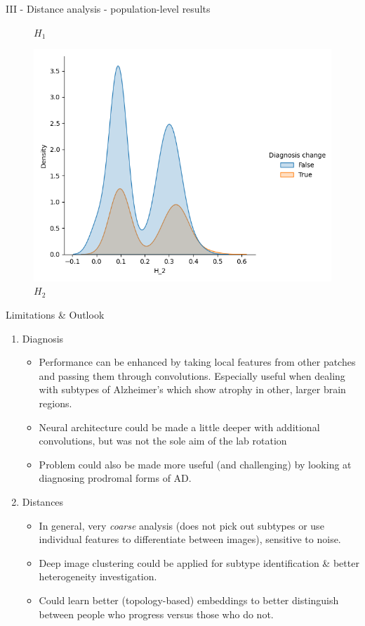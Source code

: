 \documentclass[aspectratio=169, 10pt, dvipsnames]{beamer}
\begin{document}
\begin{frame}[fragile]{III - Distance analysis - population-level results}
\begin{figure}
    \caption{$H_1$}
  \end{figure}%
  \endminipage
  \hfill
  \begin{figure}
    \centering
     \includegraphics[width=\textwidth]{figures/temporal_evolution/wasserstein_H_2_dist_diag_change.png}
     \caption{$H_2$}
  \end{figure}
  \endminipage
\end{frame}

\begin{frame}[fragile]{Limitations \& Outlook}
  \begin{enumerate}
  \item Diagnosis
    \begin{itemize}
    \item Performance can be enhanced by taking local features from other patches and passing them through convolutions. Especially useful when dealing with subtypes of Alzheimer's which show atrophy in other, larger brain regions.
    \item Neural architecture could be made a little deeper with additional convolutions, but was not the sole aim of the lab rotation
    \item Problem could also be made more useful (and challenging) by looking at diagnosing prodromal forms of AD.
  \end{itemize}
  \item Distances
    \begin{itemize}
    \item In general, very \emph{coarse} analysis (does not pick out subtypes or use individual features to differentiate between images), sensitive to noise.
    \item Deep image clustering could be applied for subtype identification \& better heterogeneity investigation.
    \item Could learn better (topology-based) embeddings to better distinguish between people who progress versus those who do not.
    \end{itemize}
  \end{enumerate}
\end{frame}
\end{document}
